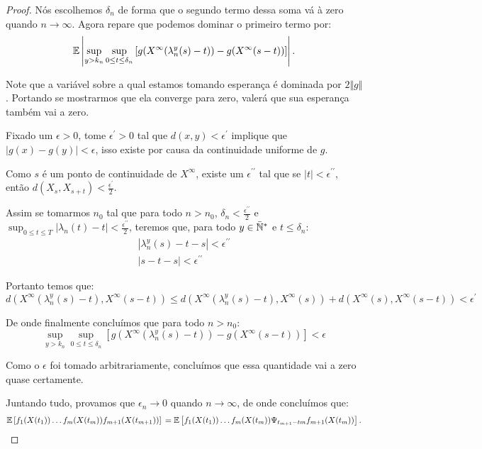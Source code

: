 \begin{proof}
  Nós escolhemos $\delta_n$ de forma que o segundo termo dessa soma vá
  à zero quando $n \to \infty$. Agora repare que podemos dominar o
  primeiro termo por:
  \begin{displaymath}
     {\mathbb{E}} \left\lvert \sup_{y > k_n}
      \sup_{0 \leq t \leq \delta_n} \left[
        g(X^\infty(\lambda_n^y(s)-t)) -
        g(X^\infty(s-t))
      \right] 
    \right\rvert.
  \end{displaymath}

  Note que a variável sobre a qual estamos tomando esperança é
  dominada por $2\Vert g \Vert$. Portando se mostrarmos que ela
  converge \qc para zero, valerá que sua esperança também vai a zero.

  Fixado um $\epsilon > 0$, tome $\epsilon^\prime > 0$ tal que $d(x, y) <
  \epsilon^\prime$ implique que $|g(x) - g(y)| < \epsilon$, isso
  existe por causa da continuidade uniforme de $g$.
 
  Como $s$ é \qc um ponto de continuidade de $X^\infty$, existe um
  $\epsilon^{\prime\prime}$ tal que se $|t| <
  \epsilon^{\prime\prime}$, então $d(X_{s}, X_{s+t}) < \frac{\epsilon^{\prime}}{2}$.

  Assim se tomarmos $n_0$ tal que para todo $n > n_0$, $\delta_{n} <
  \frac{\epsilon^{\prime\prime}}{2}$ e $\sup_{0 \leq t \leq T}
  |\lambda_n(t) - t| < \frac{\epsilon^{\prime\prime}}{2}$, teremos
  que, para todo $y\in{\mathbb{\bar{N}^*}}$ e $t \leq \delta_n$:
  \begin{gather*}
    |\lambda_n^y(s) - t - s| < \epsilon^{\prime\prime}\\
    |s - t - s | < \epsilon^{\prime\prime}
  \end{gather*}
  
  Portanto temos que:
  \begin{displaymath}
    d(X^\infty(\lambda_n^y(s)-t), X^\infty(s-t)) \leq
     d(X^\infty(\lambda_n^y(s)-t), X^\infty(s))+
     d(X^\infty(s), X^\infty(s-t))
     < \epsilon^{\prime}
  \end{displaymath}

  De onde finalmente concluímos que para todo $n > n_0$:
  \begin{displaymath} 
    \sup_{y > k_n}
    \sup_{0 \leq t \leq \delta_n} \left[
      g(X^\infty(\lambda_n^y(s)-t)) -
      g(X^\infty(s-t))
    \right] < \epsilon
  \end{displaymath}

  Como o $\epsilon$ foi tomado arbitrariamente, concluímos que essa
  quantidade vai a zero quase certamente.


  Juntando tudo, provamos que $\epsilon_n \to 0$ quando $n \to
  \infty$, de onde concluímos que:
  \begin{displaymath}
    {\mathbb{E}} \left[
      f_{1}(X(t_{1})) 
      \ldots
      f_{m}(X(t_{m})) 
      f_{m+1}(X(t_{m+1})) 
    \right] \notag\\
    = {\mathbb{E}} \left[
      f_{1}(X(t_{1})) 
      \ldots
      f_{m}(X(t_{m})) 
      \Psi_{t_{m+1} - t{m}} f_{m+1} (X(t_{m})) 
    \right].
  \end{displaymath}
\end{proof}





